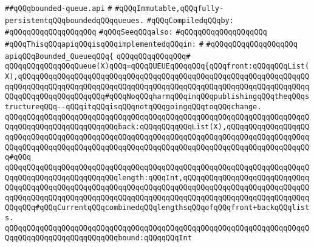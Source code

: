 \label{src/lib/src/bounded-queue.api}
\verb|##qQQqbounded-queue.api|\newline
\verb|#|\newline
\verb|#qQQqImmutable,qQQqfully-persistentqQQqboundedqQQqqueues.|\newline
\newline
\verb|#qQQqCompiledqQQqby:|\newline
\verb|#qQQqqQQqqQQqqQQqqQQq|\newline
\newline
\newline
\verb|#qQQqSeeqQQqalso:|\newline
\verb|#qQQqqQQqqQQqqQQqqQQq|\newline
\newline
\verb|#qQQqThisqQQqapiqQQqisqQQqimplementedqQQqin:|\newline
\verb|#|\newline
\verb|#qQQqqQQqqQQqqQQqqQQq|\newline
\newline
\verb|apiqQQqBounded_QueueqQQq{|\newline
\verb|qQQqqQQqqQQqqQQq#|\newline
\verb|qQQqqQQqqQQqqQQqQueue(X)qQQq=qQQqQUEUEqQQqqQQq{qQQqfront:qQQqqQQqList(X),qQQqqQQqqQQqqQQqqQQqqQQqqQQqqQQqqQQqqQQqqQQqqQQqqQQqqQQqqQQqqQQqqQQqqQQqqQQqqQQqqQQqqQQqqQQqqQQqqQQqqQQqqQQqqQQqqQQqqQQqqQQqqQQqqQQqqQQqqQQqqQQqqQQqqQQqqQQqqQQq#qQQqNoqQQqharmqQQqinqQQqpublishingqQQqtheqQQqstructureqQQq--qQQqitqQQqisqQQqnotqQQqgoingqQQqtoqQQqchange.|\newline
\verb|qQQqqQQqqQQqqQQqqQQqqQQqqQQqqQQqqQQqqQQqqQQqqQQqqQQqqQQqqQQqqQQqqQQqqQQqqQQqqQQqqQQqqQQqqQQqqQQqback:qQQqqQQqqQQqList(X),qQQqqQQqqQQqqQQqqQQqqQQqqQQqqQQqqQQqqQQqqQQqqQQqqQQqqQQqqQQqqQQqqQQqqQQqqQQqqQQqqQQqqQQqqQQqqQQqqQQqqQQqqQQqqQQqqQQqqQQqqQQqqQQqqQQqqQQqqQQqqQQqqQQqqQQqqQQqqQQq#qQQq|\newline
\verb|qQQqqQQqqQQqqQQqqQQqqQQqqQQqqQQqqQQqqQQqqQQqqQQqqQQqqQQqqQQqqQQqqQQqqQQqqQQqqQQqqQQqqQQqqQQqqQQqlength:qQQqInt,qQQqqQQqqQQqqQQqqQQqqQQqqQQqqQQqqQQqqQQqqQQqqQQqqQQqqQQqqQQqqQQqqQQqqQQqqQQqqQQqqQQqqQQqqQQqqQQqqQQqqQQqqQQqqQQqqQQqqQQqqQQqqQQqqQQqqQQqqQQqqQQqqQQqqQQqqQQqqQQqqQQqqQQqqQQqqQQq#qQQqCurrentqQQqcombinedqQQqlengthsqQQqofqQQqfront+backqQQqlists.|\newline
\verb|qQQqqQQqqQQqqQQqqQQqqQQqqQQqqQQqqQQqqQQqqQQqqQQqqQQqqQQqqQQqqQQqqQQqqQQqqQQqqQQqqQQqqQQqqQQqqQQqbound:qQQqqQQqInt|\newline
